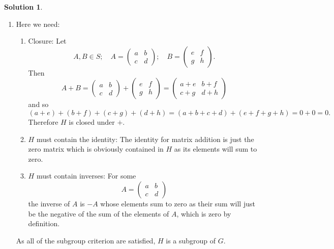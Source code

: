 \documentclass[10pt]{article}
\theoremstyle{definition}
\newtheorem{soln}{Solution}
\begin{document}
\begin{soln}~
  \begin{enumerate}[label=(\alph*)]
    \item Here we need: \begin{enumerate}[label=(\roman*)]
            \item Closure: Let
                  $$A,B\in S;\quad A=\begin{pmatrix}
                      a & b \\
                      c & d
                    \end{pmatrix};\quad B=\begin{pmatrix}
                      e & f \\
                      g & h
                    \end{pmatrix}.$$
                  Then
                  $$A+B=\begin{pmatrix}
                      a & b \\
                      c & d
                    \end{pmatrix}+\begin{pmatrix}
                      e & f \\
                      g & h
                    \end{pmatrix}=\begin{pmatrix}
                      a+e & b+f \\
                      c+g & d+h
                    \end{pmatrix}$$
                  and so
                  $$(a+e)+(b+f)+(c+g)+(d+h)=(a+b+c+d)+(e+f+g+h)=0+0=0.$$
                  Therefore $H$ is closed under $+$.
            \item $H$ must contain the identity: The identity for matrix addition is just the zero matrix which is obviously
                  contained in $H$ as its elements will sum to zero.
            \item $H$ must contain inverses: For some
                  $$A=\begin{pmatrix}
                      a & b \\
                      c & d
                    \end{pmatrix}$$
                  the inverse of $A$ is $-A$ whose elements sum to zero as their sum will just be the negative of the sum of the elements of $A$,
                  which is zero by definition.
          \end{enumerate}
          As all of the subgroup criterion are satisfied, $H$ is a subgroup of $G$.

\end{enumerate}
\end{soln}
\end{document}

